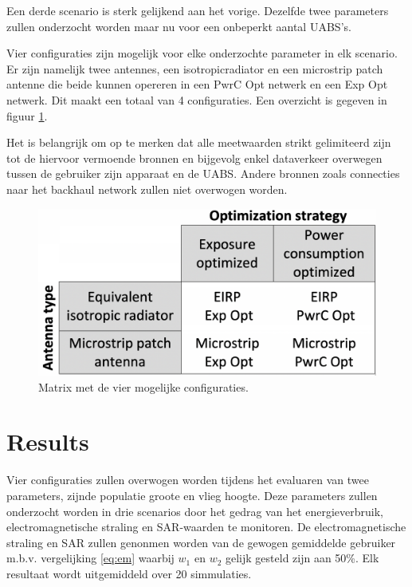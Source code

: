 \documentclass[twocolumn]{phdsymp_dutch}
\begin{document}
Een derde scenario is sterk gelijkend aan het vorige. Dezelfde twee parameters zullen onderzocht 
worden maar nu voor een onbeperkt aantal \gls{UABS}'s.

Vier configuraties zijn mogelijk voor elke onderzochte parameter in elk scenario.
Er zijn namelijk twee antennes, een \gls{isotropicradiator} en een microstrip patch antenne die
beide kunnen opereren in een \gls{PwrC Opt} netwerk en een \gls{Exp Opt} netwerk. Dit maakt een totaal van 4 configuraties.
Een overzicht is gegeven in figuur \ref{fig:fourCasesMatrix}.

Het is belangrijk om op te merken dat alle meetwaarden strikt gelimiteerd zijn tot de hiervoor vermoende bronnen en 
bijgevolg enkel dataverkeer overwegen tussen de gebruiker zijn apparaat en de \gls{UABS}. 
Andere bronnen zoals connecties naar het backhaul network zullen niet overwogen worden.

\begin{figure}[h!]
  \includegraphics[width=\linewidth]{fourCasesMatrix.png}
  \caption{Matrix met de vier mogelijke configuraties.}
  \label{fig:fourCasesMatrix}
\end{figure}

\section{Results}
Vier configuraties zullen overwogen worden tijdens het evaluaren van twee parameters, zijnde 
populatie groote en vlieg hoogte. Deze parameters zullen onderzocht worden in drie scenarios 
door het gedrag van het energieverbruik, electromagnetische straling en \gls{SAR}-waarden te monitoren.
De electromagnetische straling en \gls{SAR} zullen genonmen worden van de gewogen gemiddelde gebruiker
m.b.v. vergelijking \ref{eq:em} waarbij $w_{1}$ en $w_{2}$ gelijk gesteld zijn aan 50\%. 
Elk resultaat wordt uitgemiddeld over 20 simmulaties.
\end{document}
